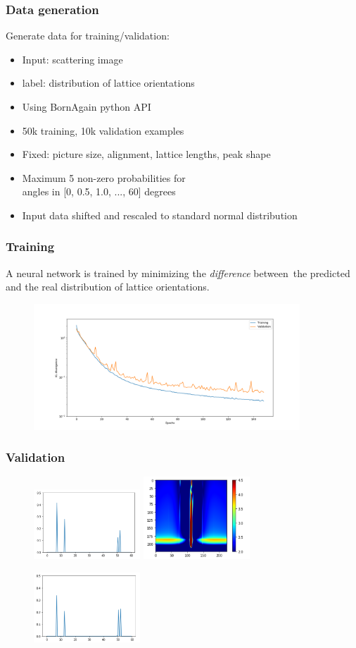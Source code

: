 \documentclass{beamer}
\begin{document}
\begin{frame}
    \frametitle{Data generation}
    Generate data for training/validation:
    \begin{itemize}
        \item Input: scattering image
        \item label: distribution of lattice orientations
        \item Using BornAgain python API
        \item 50k training, 10k validation examples
        \item Fixed: picture size, alignment, lattice lengths, peak shape
        \item Maximum 5 non-zero probabilities for \\
              angles in [0, 0.5, 1.0, ..., 60] degrees
        \item Input data shifted and rescaled to standard normal distribution
    \end{itemize}
\end{frame}

\begin{frame}
    \frametitle{Training}
    A neural network is trained by minimizing the \emph{difference} between\
    the predicted and the real distribution of lattice orientations.
    \begin{figure}
        \includegraphics[width=10cm]{losses.png}
    \end{figure}
\end{frame}

\begin{frame}
    \frametitle{Validation}
    \begin{figure}
        \includegraphics[width=4cm]{distr_orig.png}
        \includegraphics[width=4cm]{intensity_orig.png}
    \end{figure}
    \begin{figure}
        \includegraphics[width=4cm]{distr_pred.png}
    \end{figure}
\end{frame}
\end{document}
